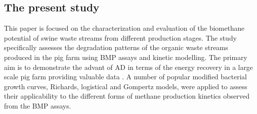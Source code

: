 \subsection{The present study}
This paper is focused on the characterization and evaluation of the biomethane potential of swine waste streams from different production stages. The study specifically assesses the degradation patterns of the organic waste streams produced in the pig farm using BMP assays and kinetic modelling. The primary aim is to demonstrate the advant of AD in terms of the energy recovery in a large scale pig farm providing valuable data . A number of popular modified bacterial growth curves, Richards, logistical and Gompertz models, were applied to assess their applicability to the different forms of methane production kinetics observed from the BMP assays.